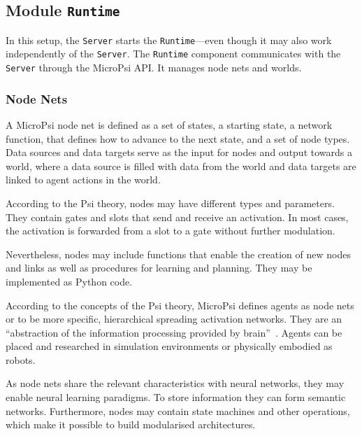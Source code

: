         \subsection{Module \texttt{Runtime}}
In this setup, the \texttt{Server} starts the \texttt{Runtime}---even though it may also work independently of the \texttt{Server}. The \texttt{Runtime} component communicates with the \texttt{Server} through the MicroPsi API. It manages node nets and worlds.

        \subsubsection{Node Nets}

        
A MicroPsi node net is defined as a set of states, a starting state, a network function, that defines how to advance to the next state, and a set of node types. Data sources and data targets serve as the input for nodes and output towards a world, where a data source is filled with data from the world and data targets are linked to agent actions in the world.

According to the Psi theory, nodes may have different types and parameters. They contain gates and slots that send and receive an activation. In most cases, the activation is forwarded from a slot to a gate without further modulation.

Nevertheless, nodes may include functions that enable the creation of new nodes and links as well as procedures for learning and planning. They may be implemented as Python code.

According to the concepts of the Psi theory, MicroPsi defines agents as node nets or to be more specific, hierarchical spreading activation networks. They are an ``abstraction of the information processing provided by brain''~\cite{conf/agi/Bach12}. Agents can be placed and researched in simulation environments or physically embodied as robots.



As node nets share the relevant characteristics with neural networks, they may enable neural learning paradigms. To store information they can form semantic networks. Furthermore, nodes may contain state machines and other operations, which make it possible to build modularised architectures.


